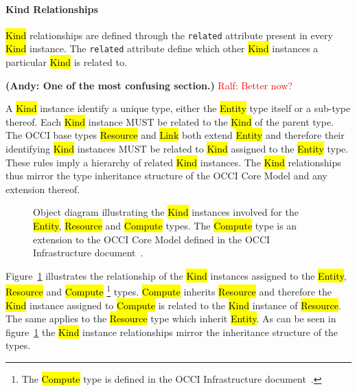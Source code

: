 \documentclass[10pt,a4paper]{article}
\newcommand{\ralf}[1]{\textcolor{red}{Ralf: #1}}
\begin{document}
\paragraph*{Kind Relationships}
\hl{Kind} relationships are defined through the {\tt related} attribute present
in every \hl{Kind} instance. The {\tt related} attribute define which other
\hl{Kind} instances a particular \hl{Kind} is related to.

\textbf{(Andy: One of the most confusing section.)}
\ralf{Better now?}

A \hl{Kind} instance identify a unique type, either the \hl{Entity} type itself
or a sub-type thereof.  Each \hl{Kind} instance MUST be related to the
\hl{Kind} of the parent type.
%
The OCCI base types \hl{Resource} and \hl{Link} both extend \hl{Entity} and
therefore their identifying \hl{Kind} instances MUST be related to \hl{Kind}
assigned to the \hl{Entity} type.
%
These rules imply a hierarchy of related \hl{Kind} instances. The \hl{Kind}
relationships thus mirror the type inheritance structure of the OCCI Core
Model and any extension thereof.

\begin{figure}[!h]
{\centering {} \par}
  \caption{Object diagram illustrating the \hl{Kind} instances involved for the
  \hl{Entity}, \hl{Resource} and \hl{Compute} types. The \hl{Compute} type is an
  extension to the OCCI Core Model defined in the OCCI Infrastructure
  document~\cite{occi:infrastructure}.}
  \label{fig:kind_relationships}
\end{figure}

Figure~\ref{fig:kind_relationships} illustrates the relationship of the \hl{Kind}
instances assigned to the \hl{Entity}, \hl{Resource} and \hl{Compute}%
\footnote{The \hl{Compute} type is defined in the OCCI Infrastructure
 document~\cite{occi:infrastructure}.}
types.
%
\hl{Compute} inherits \hl{Resource} and therefore the \hl{Kind} instance
assigned to \hl{Compute} is related to the \hl{Kind} instance of \hl{Resource}.
The same applies to the \hl{Resource} type which inherit \hl{Entity}.
%
As can be seen in figure~\ref{fig:kind_relationships} the \hl{Kind} instance
relationships mirror the inheritance structure of the types.
\end{document}
